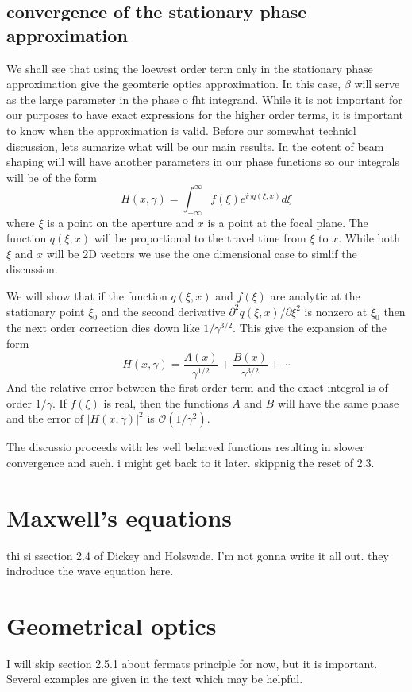 \documentclass[../../main.tex]{subfiles} %
\begin{document}
\subsection{convergence of the stationary phase approximation}
We shall see that using the loewest order term only in the stationary phase approximation give the geomteric optics approximation. In this case, $\beta$ will serve as the large parameter in the phase o fht integrand. While it is not important for our purposes to have exact expressions for the higher order terms, it is important to know when the approximation is valid. Before our somewhat technicl discussion, lets sumarize what will be our main results. In the cotent of beam shaping will will have another parameters in our phase functions so our integrals will be of the form
\begin{equation}
    H(x,\gamma)=\int_{-\infty}^\infty f(\xi)e^{i\gamma q(\xi,x)}d\xi
\end{equation}
where $\xi$ is a point on the aperture and $x$ is a point at the focal plane. The function $q(\xi,x)$ will be proportional to the travel time from $\xi$ to $x$. While both $\xi$ and $x$ will be 2D vectors we use the one dimensional case to simlif the discussion. 

We will show that if the function $q(\xi,x)$ and $f(\xi)$ are analytic at the stationary point $\xi_0$ and the second derivative  $\partial^2q(\xi,x)/\partial \xi^2$ is nonzero at $\xi_0$ then the next order correction dies down like $1/\gamma^{3/2}$. This give the expansion of the form
\begin{equation}
    H(x,\gamma)=\frac{A(x)}{\gamma^{1/2}}+\frac{B(x)}{\gamma^{3/2}}+\cdots
\end{equation}
And the relative error between the first order term and the exact integral is of order $1/\gamma$. If $f(\xi)$ is real, then the functions $A$ and $B$ will have the same phase and the error of $|H(x,\gamma)|^2$ is $\mathcal{O}(1/\gamma^2)$.

The discussio proceeds with les well behaved functions resulting in slower convergence and such. i might get back to it later. skippnig the reset of 2.3. 
\section{Maxwell's equations}
thi si ssection 2.4 of Dickey and Holswade. I'm not gonna write it all out. they indroduce the wave equation here. 

\section{Geometrical optics}
I will skip section 2.5.1 about fermats principle for now, but it is important. Several examples are given in the text which may be helpful. 
\end{document}
